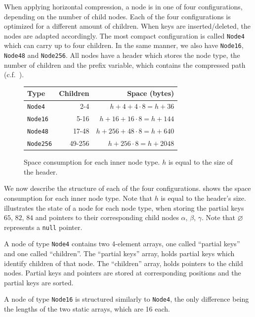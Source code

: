 \documentclass[abstracton,12pt]{scrartcl}
\theoremstyle{definition}
\begin{document}
When applying horizontal compression, a node is in one of four configurations, 
depending on the number of child nodes. Each of the four configurations is 
optimized for a different amount of children.
When keys are inserted/deleted, the nodes are adapted accordingly.
The most compact configuration 
is called \texttt{Node4} which can carry up to four children. 
In the same manner, we also have \texttt{Node16}, \texttt{Node48} 
and \texttt{Node256}. All nodes have a header which stores the node type,
the number of children and the prefix variable, which contains the compressed
path (c.f.\ ).

\begin{figure}[h]
  \centering
  \begin{tabular}{ l|r|r } 
    Type & Children & Space (bytes) \\
    \hline
    \texttt{Node4} & 2-4 & $h + 4 + 4 \cdot 8 = h + 36$ \\ 
    \texttt{Node16} & 5-16 & $h + 16 + 16 \cdot 8 = h + 144$ \\ 
    \texttt{Node48} & 17-48 & $h + 256 + 48 \cdot 8 = h + 640$ \\ 
    \texttt{Node256} & 49-256 & $h + 256 \cdot 8 = h + 2048$ 
  \end{tabular}
  \caption{Space consumption for each inner node type. $h$ is equal to
    the size of the header.}
  \label{fig:node-sizes}
\end{figure}

We now describe the structure of each of the four configurations.
 shows the space consumption for each inner node type.
Note that $h$ is equal to the header's size.
 illustrates the state of a node
for each node type,
when storing the partial keys $65$, $82$, $84$ and pointers to their 
corresponding child nodes $\alpha$, $\beta$, $\gamma$. 
Note that $\varnothing$ represents a \texttt{null} pointer.

A node of type \texttt{Node4} contains two 4-element arrays, one called
``partial keys'' and one called ``children''.
The ``partial keys'' array, holds
partial keys which identify children of that node. 
The ``children'' array, holds pointers to the child nodes.
Partial keys and pointers are stored at corresponding positions and
the partial keys are sorted.

A node of type \texttt{Node16} is structured similarly
to \texttt{Node4}, the only difference being the lengths of the two static 
arrays, which are 16 each.
\end{document}
